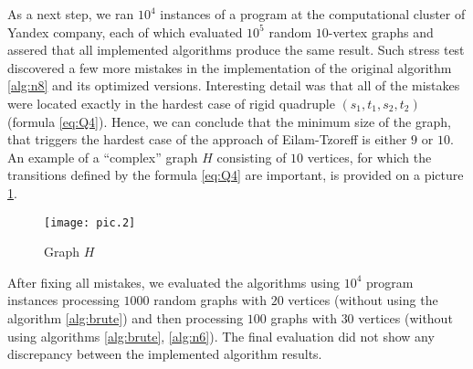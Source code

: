 As a next step, we ran $10^4$ instances of a program at the computational cluster of Yandex company, each of which evaluated $10^5$ random $10$-vertex graphs and assered that all implemented algorithms  produce the same result. Such stress test discovered a few more mistakes in the implementation of the original algorithm \ref{alg:n8} and its optimized versions. Interesting detail was that all of the mistakes were located exactly in the hardest case of rigid quadruple $(s_1, t_1, s_2, t_2)$ (formula \eqref{eq:Q4}). Hence, we can conclude that the minimum size of the graph, that triggers the hardest case of the approach of Eilam-Tzoreff is either $9$ or $10$. An example of a ``complex'' graph $H$ consisting of $10$ vertices, for which the transitions defined by the formula \eqref{eq:Q4} are important, is provided on a picture \ref{pic:hard}.

\begin{figure}[H]
\caption{Graph $H$}
\label{pic:hard}
\centering
\texttt{[image: pic.2]}
\end{figure}

After fixing all mistakes, we evaluated the algorithms using $10^4$ program instances processing $1000$ random graphs with $20$ vertices (without using the algorithm \ref{alg:brute}) and then processing $100$ graphs with $30$ vertices (without using algorithms \ref{alg:brute}, \ref{alg:n6}). The final evaluation did not show any discrepancy between the implemented algorithm results.
